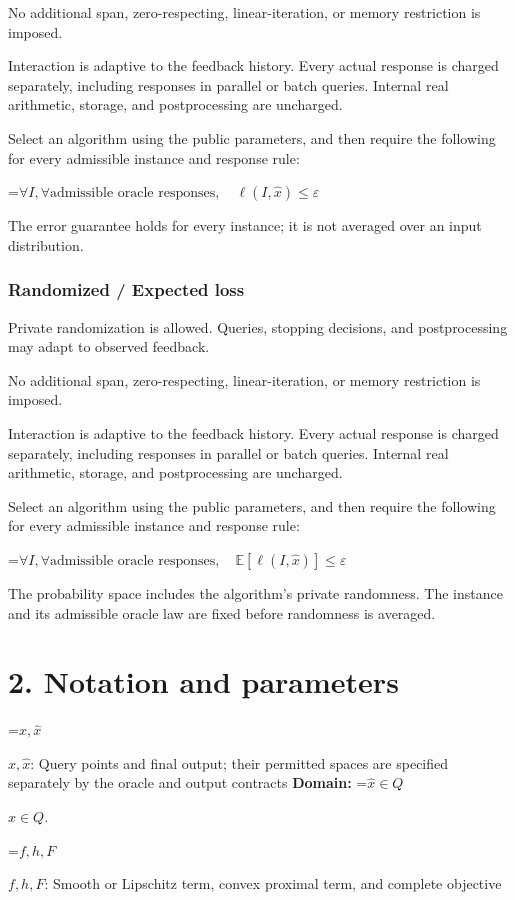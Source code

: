 \documentclass[10pt,a4paper]{article}
\newcommand{\AtlasMath}[1]{\par\begingroup\centering\setbox0=\hbox{$\displaystyle #1$}\ifdim\wd0>1.4\linewidth\typeout{ATLAS WIDE FORMULA: \the\wd0}\fi\ifdim\wd0>\linewidth\resizebox{\linewidth}{!}{\box0}\else\box0\fi\par\endgroup}
\newcommand{\AtlasInlineMath}[1]{\begingroup\setbox0=\hbox{$#1$}\ifdim\wd0>.4\linewidth\endgroup\AtlasMath{#1}\else\endgroup$#1$\fi}
\begin{document}
No additional span, zero-respecting, linear-iteration, or memory restriction is imposed.

Interaction is adaptive to the feedback history. Every actual response is charged separately, including responses in parallel or batch queries. Internal real arithmetic, storage, and postprocessing are uncharged.

Select an algorithm using the public parameters, and then require the following for every admissible instance and response rule:


\AtlasMath{\forall I,\forall\text{admissible oracle responses},\quad\ell(I,\widehat{x})\le\varepsilon}


The error guarantee holds for every instance; it is not averaged over an input distribution.

\subsubsection{Randomized / Expected loss}
Private randomization is allowed. Queries, stopping decisions, and postprocessing may adapt to observed feedback.

No additional span, zero-respecting, linear-iteration, or memory restriction is imposed.

Interaction is adaptive to the feedback history. Every actual response is charged separately, including responses in parallel or batch queries. Internal real arithmetic, storage, and postprocessing are uncharged.

Select an algorithm using the public parameters, and then require the following for every admissible instance and response rule:


\AtlasMath{\forall I,\forall\text{admissible oracle responses},\quad\mathbb{E}[\ell(I,\widehat{x})]\le\varepsilon}


The probability space includes the algorithm's private randomness. The instance and its admissible oracle law are fixed before randomness is averaged.

\section{2. Notation and parameters}
\AtlasInlineMath{x,\widehat{x}}: Query points and final output; their permitted spaces are specified separately by the oracle and output contracts \textbf{Domain:} \AtlasInlineMath{\widehat{x}\in Q}.

\AtlasInlineMath{f,h,F}: Smooth or Lipschitz term, convex proximal term, and complete objective
\end{document}
